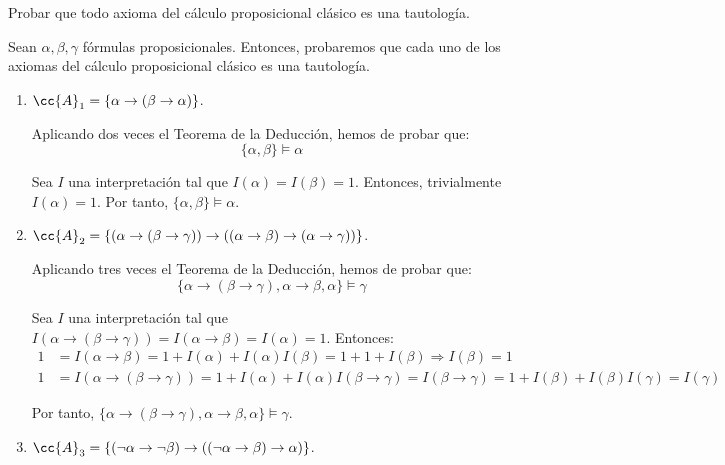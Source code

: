 \begin{ejercicio}\label{ej:1.5}
    Probar que todo axioma del cálculo proposicional clásico es una tautología.

    Sean $\alpha,\beta,\gamma$ fórmulas proposicionales. Entonces, probaremos que cada uno de los axiomas del cálculo proposicional clásico es una tautología.
    \begin{enumerate}
        \item $\cc{A}_1 = \{\alpha\rightarrow(\beta\rightarrow\alpha)\}$.
        
        Aplicando dos veces el Teorema de la Deducción, hemos de probar que:
        \begin{equation*}
            \{\alpha,\beta\} \models \alpha
        \end{equation*}

        Sea $I$ una interpretación tal que $I(\alpha) = I(\beta) = 1$. Entonces, trivialmente $I(\alpha) = 1$. Por tanto, $\{\alpha,\beta\} \models \alpha$.
        \item $\cc{A}_2 = \{(\alpha\rightarrow(\beta\rightarrow\gamma))\rightarrow((\alpha\rightarrow\beta)\rightarrow(\alpha\rightarrow\gamma))\}$.
        
        Aplicando tres veces el Teorema de la Deducción, hemos de probar que:
        \begin{equation*}
            \{\alpha\rightarrow(\beta\rightarrow\gamma),\alpha\rightarrow\beta,\alpha\} \models \gamma
        \end{equation*}

        Sea $I$ una interpretación tal que $I\left(\alpha\rightarrow(\beta\rightarrow\gamma)\right) = I\left(\alpha\rightarrow\beta\right) = I(\alpha) = 1$. Entonces:
        \begin{align*}
            1&= I(\alpha\rightarrow\beta) = 1+I(\alpha)+I(\alpha)I(\beta)=1+1+I(\beta)\Longrightarrow I(\beta)=1\\
            1&=I\left(\alpha\rightarrow(\beta\rightarrow\gamma)\right) = 1+I(\alpha)+I(\alpha)I(\beta\rightarrow\gamma) = I(\beta\rightarrow\gamma)
            = 1+I(\beta)+I(\beta)I(\gamma) = I(\gamma)
        \end{align*}

        Por tanto, $\{\alpha\rightarrow(\beta\rightarrow\gamma),\alpha\rightarrow\beta,\alpha\} \models \gamma$.
        \item $\cc{A}_3 = \{(\neg\alpha\rightarrow\neg\beta)\rightarrow\left((\neg\alpha\rightarrow\beta)\rightarrow\alpha\right)\}$.
        

\end{enumerate}
\end{ejercicio}
